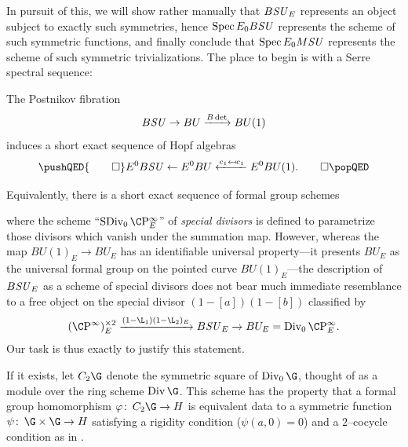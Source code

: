 \noindent In pursuit of this, we will show rather manually that \(B\mathit{SU}_E\) represents an object subject to exactly such symmetries, hence \(\operatorname{Spec} E_0 B\mathit{SU}\) represents the scheme of such symmetric functions, and finally conclude that \(\operatorname{Spec} E_0 M\mathit{SU}\) represents the scheme of such symmetric trivializations.
The place to begin is with a Serre spectral sequence:
\begin{lemma}\label{BSUtoBUtoCPinftyIsSexseq}
The Postnikov fibration \[B\mathit{SU} \to BU \xrightarrow{B\det} BU(1)\] induces a short exact sequence of Hopf algebras
\[\pushQED{\qed}
E^0 B\SU \from E^0 BU \xleftarrow{c_1 \mapsfrom c_1} E^0 BU(1). \qedhere
\popQED\]
\end{lemma}

\noindent Equivalently, there is a short exact sequence of formal group schemes
\begin{center}
\end{center}
where the scheme ``\(\SDiv_0 \CP^\infty_E\)'' of \textit{special divisors} is defined to parametrize those divisors which vanish under the summation map.
However, whereas the map \(BU(1)_E \to BU_E\) has an identifiable universal property---it presents \(BU_E\) as the universal formal group on the pointed curve \(BU(1)_E\)---the description of \(B\mathit{SU}_E\) as a scheme of special divisors does not bear much immediate resemblance to a free object on the special divisor \((1 - [a])(1 - [b])\) classified by \[(\CP^\infty)^{\times 2}_E \xrightarrow{(1 - \L_1)(1 - \L_2)_E} B\SU_E \to BU_E = \Div_0 \CP^\infty_E.\]
Our task is thus exactly to justify this statement.

\begin{definition}\label{DefinitionOfC2G}
If it exists, let \(C_2 \G\) denote the symmetric square of \(\Div_0 \G\), thought of as a module over the ring scheme \(\Div \G\).
This scheme has the property that a formal group homomorphism \(\phi\co C_2 \G \to H\) is equivalent data to a symmetric function \(\psi\co \G \times \G \to H\) satisfying a rigidity condition (\(\psi(a, 0) = 0\)) and a \(2\)--cocycle condition as in .
\end{definition}

